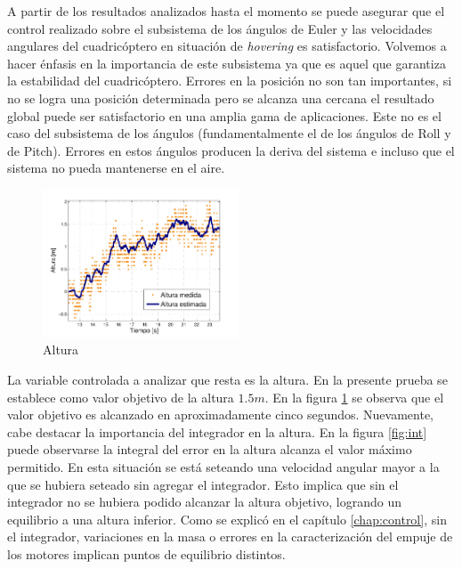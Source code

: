\documentclass[main]{subfiles}
\begin{document}
A partir de los resultados analizados hasta el momento se puede asegurar que el control realizado sobre el subsistema de los \'angulos de Euler y las velocidades angulares del cuadric\'optero en situaci\'on de \emph{hovering} es satisfactorio. Volvemos a hacer \'enfasis en la importancia de este subsistema ya que es aquel que garantiza la estabilidad del cuadric\'optero. Errores en la posici\'on no son tan importantes, si no se logra una posici\'on determinada pero se alcanza una cercana el resultado global puede ser satisfactorio en una amplia gama de aplicaciones. Este no es el caso del subsistema de los \'angulos (fundamentalmente el de los \'angulos de Roll y de Pitch). Errores en estos \'angulos producen la deriva del sistema e incluso que el sistema no pueda mantenerse en el aire. \\


\begin{figure}
	\centering
	\vspace{-10pt}
	\includegraphics[width=0.52\textwidth]{./pics_test_control/z.pdf}
	\caption{Altura}
	\label{fig:z}
\end{figure}
La variable controlada a analizar que resta es la altura. En la presente prueba se establece como valor objetivo de la altura $1.5m$. En la figura \ref{fig:z} se observa que el valor objetivo es alcanzado en aproximadamente cinco segundos. Nuevamente, cabe destacar la importancia del integrador en la altura. En la figura \ref{fig:int} puede observarse la integral del error en la altura alcanza el valor m\'aximo permitido. En esta situaci\'on se est\'a seteando una velocidad angular mayor a la que se hubiera seteado sin agregar el integrador. Esto implica que sin el integrador no se hubiera podido alcanzar la altura objetivo, logrando un equilibrio a una altura inferior. Como se explic\'o en el cap\'itulo \ref{chap:control}, sin el integrador, variaciones en la masa o errores en la caracterizaci\'on del empuje de los motores implican puntos de equilibrio distintos. \\
\end{document}
